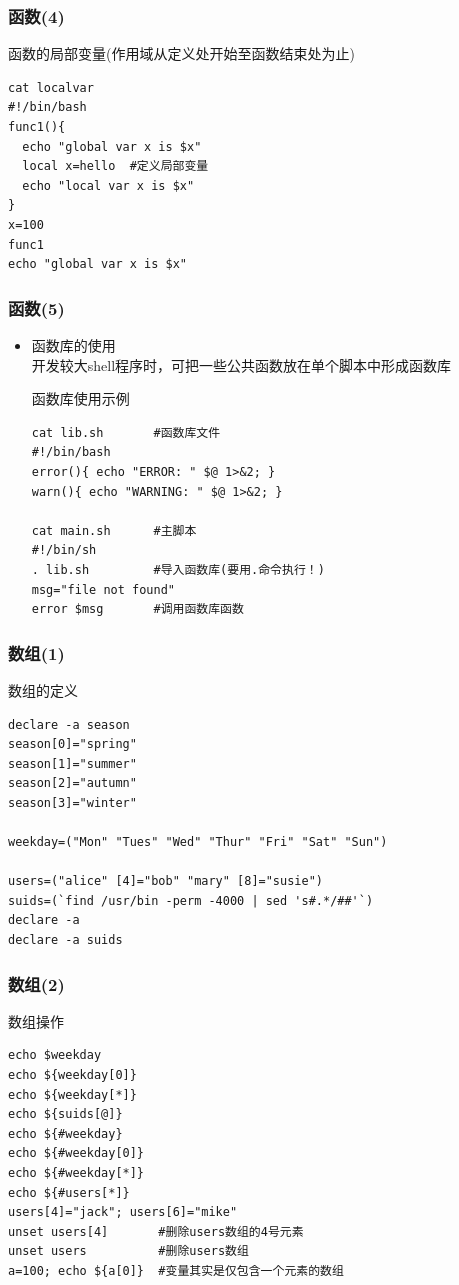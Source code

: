 \documentclass[xcolor=svgnames,presentation]{beamer}
\begin{document}
\begin{frame}[fragile]
\frametitle{函数(4)}
\label{sec-1-2-54}
\begin{exampleblock}{函数的局部变量(作用域从定义处开始至函数结束处为止)}
\label{sec-1-2-54-1}


\begin{verbatim}
cat localvar
#!/bin/bash
func1(){
  echo "global var x is $x"
  local x=hello  #定义局部变量
  echo "local var x is $x"
}
x=100
func1
echo "global var x is $x"
\end{verbatim}
\end{exampleblock}
\end{frame}
\begin{frame}[fragile]
\frametitle{函数(5)}
\label{sec-1-2-55}
\begin{itemize}

\item 函数库的使用\\
\label{sec-1-2-55-1}%
开发较大shell程序时，可把一些公共函数放在单个脚本中形成函数库
\begin{exampleblock}{函数库使用示例}
\label{sec-1-2-55-1-1}


\begin{verbatim}
cat lib.sh       #函数库文件
#!/bin/bash
error(){ echo "ERROR: " $@ 1>&2; }
warn(){ echo "WARNING: " $@ 1>&2; }

cat main.sh      #主脚本
#!/bin/sh
. lib.sh         #导入函数库(要用.命令执行！)
msg="file not found"
error $msg       #调用函数库函数
\end{verbatim}
\end{exampleblock}
\end{itemize} %
\end{frame}
\begin{frame}[fragile]
\frametitle{数组(1)}
\label{sec-1-2-56}
\begin{exampleblock}{数组的定义}
\label{sec-1-2-56-1}


\begin{verbatim}
declare -a season
season[0]="spring"
season[1]="summer"
season[2]="autumn"
season[3]="winter"

weekday=("Mon" "Tues" "Wed" "Thur" "Fri" "Sat" "Sun")

users=("alice" [4]="bob" "mary" [8]="susie")
suids=(`find /usr/bin -perm -4000 | sed 's#.*/##'`)
declare -a
declare -a suids
\end{verbatim}
\end{exampleblock}
\end{frame}
\begin{frame}[fragile]
\frametitle{数组(2)}
\label{sec-1-2-57}
\begin{exampleblock}{数组操作}
\label{sec-1-2-57-1}


\begin{verbatim}
echo $weekday
echo ${weekday[0]}
echo ${weekday[*]}
echo ${suids[@]}
echo ${#weekday}
echo ${#weekday[0]}
echo ${#weekday[*]}
echo ${#users[*]}
users[4]="jack"; users[6]="mike"
unset users[4]       #删除users数组的4号元素
unset users          #删除users数组
a=100; echo ${a[0]}  #变量其实是仅包含一个元素的数组
\end{verbatim}
\end{exampleblock}
\end{frame}
\end{document}
